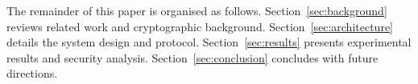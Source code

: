 The remainder of this paper is organised as follows.
Section~\ref{sec:background} reviews related work and cryptographic
background. Section~\ref{sec:architecture} details the system design
and protocol. Section~\ref{sec:results} presents experimental results
and security analysis. Section~\ref{sec:conclusion} concludes with
future directions.

